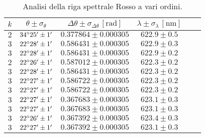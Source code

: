 \documentclass[]{article}
\begin{document}
    \begin{table}[H]
        \centering
        \begin{tabular}{||c|c|c|c|c|c||}
            \hline
            $k$ & $\theta \pm \sigma_{\theta}$ & $\Delta\theta \pm \sigma_{\Delta\theta} \, \left[\text{rad}\right]$ & $\lambda \pm \sigma_{\lambda} \, \left[\text{nm}\right]$ \\\hline
            \hline
            $2$ & $34\degree 25' \pm 1'$ & $0.377864 \pm 0.000305$ & $622.9 \pm 0.5$ \\\hline
            $3$ & $22\degree 28' \pm 1'$ & $0.586431 \pm 0.000305$ & $622.9 \pm 0.3$ \\\hline
            $3$ & $22\degree 28' \pm 1'$ & $0.586431 \pm 0.000305$ & $622.9 \pm 0.2$ \\\hline
            $2$ & $22\degree 26' \pm 1'$ & $0.587012 \pm 0.000305$ & $622.3 \pm 0.2$ \\\hline
            $3$ & $22\degree 28' \pm 1'$ & $0.586431 \pm 0.000305$ & $622.3 \pm 0.2$ \\\hline
            $3$ & $22\degree 27' \pm 1'$ & $0.586722 \pm 0.000305$ & $622.3 \pm 0.2$ \\\hline
            $3$ & $22\degree 27' \pm 1'$ & $0.586722 \pm 0.000305$ & $622.3 \pm 0.2$ \\\hline
            $3$ & $22\degree 27' \pm 1'$ & $0.367683 \pm 0.000305$ & $623.1 \pm 0.3$ \\\hline
            $3$ & $22\degree 27' \pm 1'$ & $0.367683 \pm 0.000305$ & $623.1 \pm 0.3$ \\\hline
            $3$ & $22\degree 26' \pm 1'$ & $0.367392 \pm 0.000305$ & $623.4 \pm 0.3$ \\\hline
            $3$ & $22\degree 27' \pm 1'$ & $0.367392 \pm 0.000305$ & $623.1 \pm 0.3$ \\\hline
        \end{tabular}
        \caption{Analisi della riga spettrale Rosso a vari ordini.}
        \label{rosso}
    \end{table}
\end{document}
